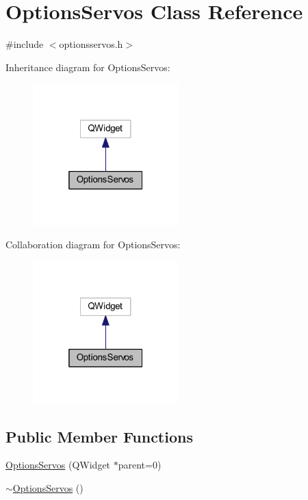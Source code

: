 \hypertarget{class_options_servos}{}\section{Options\+Servos Class Reference}
\label{class_options_servos}


{\ttfamily \#include $<$optionsservos.\+h$>$}



Inheritance diagram for Options\+Servos\+:\nopagebreak
\begin{figure}[H]
\begin{center}
\leavevmode
\includegraphics[width=160pt]{d5/dfe/class_options_servos__inherit__graph}
\end{center}
\end{figure}


Collaboration diagram for Options\+Servos\+:\nopagebreak
\begin{figure}[H]
\begin{center}
\leavevmode
\includegraphics[width=160pt]{dc/df6/class_options_servos__coll__graph}
\end{center}
\end{figure}
\subsection*{Public Member Functions}
\begin{DoxyCompactItemize}
\item 
\hyperlink{class_options_servos_a7bb41f5698acc37739be335f582003bc}{Options\+Servos} (Q\+Widget $\ast$parent=0)
\item 
\hyperlink{class_options_servos_a902dd713445ba50ea5c2f0a3cdedb612}{$\sim$\+Options\+Servos} ()
\end{DoxyCompactItemize}
